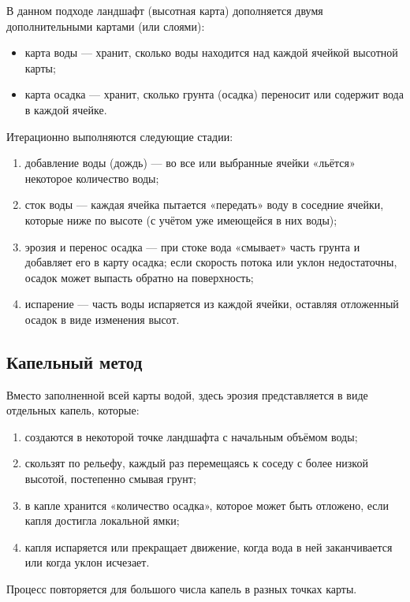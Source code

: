 В данном подходе ландшафт (высотная карта) дополняется двумя дополнительными картами (или слоями):

\begin{itemize}
\item карта воды — хранит, сколько воды находится над каждой ячейкой высотной карты;
\item карта осадка — хранит, сколько грунта (осадка) переносит или содержит вода в каждой ячейке.
\end{itemize}

Итерационно выполняются следующие стадии:

\begin{enumerate}
\item добавление воды (дождь) — во все или выбранные ячейки «льётся» некоторое количество воды;
\item сток воды — каждая ячейка пытается «передать» воду в соседние ячейки, которые ниже по высоте (с учётом уже имеющейся в них воды);
\item эрозия и перенос осадка — при стоке вода «смывает» часть грунта и добавляет его в карту осадка; если скорость потока или уклон недостаточны, осадок может выпасть обратно на поверхность;
\item испарение — часть воды испаряется из каждой ячейки, оставляя отложенный осадок в виде изменения высот.
\end{enumerate}

\subsection{Капельный метод}

Вместо заполненной всей карты водой, здесь эрозия представляется в виде отдельных капель, которые:

\begin{enumerate}
\item создаются в некоторой точке ландшафта с начальным объёмом воды;
\item скользят по рельефу, каждый раз перемещаясь к соседу с более низкой высотой, постепенно смывая грунт;
\item в капле хранится «количество осадка», которое может быть отложено, если капля достигла локальной ямки;
\item капля испаряется или прекращает движение, когда вода в ней заканчивается или когда уклон исчезает.
\end{enumerate}

Процесс повторяется для большого числа капель в разных точках карты.

